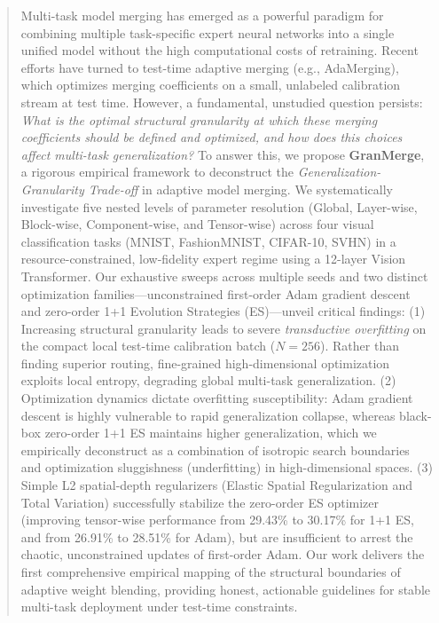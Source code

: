 \begin{abstract}
Multi-task model merging has emerged as a powerful paradigm for combining multiple task-specific expert neural networks into a single unified model without the high computational costs of retraining. 
Recent efforts have turned to test-time adaptive merging (e.g., AdaMerging), which optimizes merging coefficients on a small, unlabeled calibration stream at test time. 
However, a fundamental, unstudied question persists: \emph{What is the optimal structural granularity at which these merging coefficients should be defined and optimized, and how does this choices affect multi-task generalization?} 
To answer this, we propose \textbf{GranMerge}, a rigorous empirical framework to deconstruct the \emph{Generalization-Granularity Trade-off} in adaptive model merging. We systematically investigate five nested levels of parameter resolution (Global, Layer-wise, Block-wise, Component-wise, and Tensor-wise) across four visual classification tasks (MNIST, FashionMNIST, CIFAR-10, SVHN) in a resource-constrained, low-fidelity expert regime using a 12-layer Vision Transformer. 
Our exhaustive sweeps across multiple seeds and two distinct optimization families---unconstrained first-order Adam gradient descent and zero-order 1+1 Evolution Strategies (ES)---unveil critical findings:
(1) Increasing structural granularity leads to severe \emph{transductive overfitting} on the compact local test-time calibration batch ($N=256$). Rather than finding superior routing, fine-grained high-dimensional optimization exploits local entropy, degrading global multi-task generalization. 
(2) Optimization dynamics dictate overfitting susceptibility: Adam gradient descent is highly vulnerable to rapid generalization collapse, whereas black-box zero-order 1+1 ES maintains higher generalization, which we empirically deconstruct as a combination of isotropic search boundaries and optimization sluggishness (underfitting) in high-dimensional spaces. 
(3) Simple L2 spatial-depth regularizers (Elastic Spatial Regularization and Total Variation) successfully stabilize the zero-order ES optimizer (improving tensor-wise performance from 29.43\% to 30.17\% for 1+1 ES, and from 26.91\% to 28.51\% for Adam), but are insufficient to arrest the chaotic, unconstrained updates of first-order Adam. 
Our work delivers the first comprehensive empirical mapping of the structural boundaries of adaptive weight blending, providing honest, actionable guidelines for stable multi-task deployment under test-time constraints.
\end{abstract}
